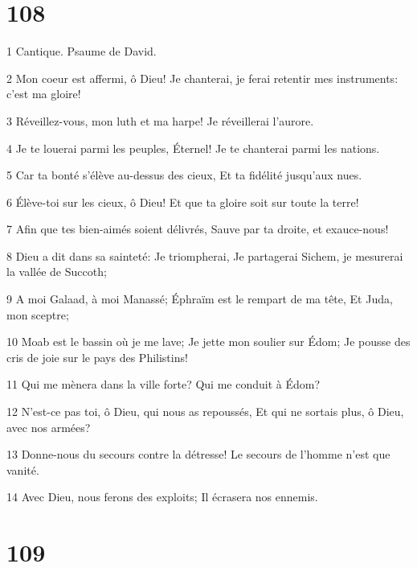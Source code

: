 \chapter{108}

\par 1 Cantique. Psaume de David.
\par 2 Mon coeur est affermi, ô Dieu! Je chanterai, je ferai retentir mes instruments: c'est ma gloire!
\par 3 Réveillez-vous, mon luth et ma harpe! Je réveillerai l'aurore.
\par 4 Je te louerai parmi les peuples, Éternel! Je te chanterai parmi les nations.
\par 5 Car ta bonté s'élève au-dessus des cieux, Et ta fidélité jusqu'aux nues.
\par 6 Élève-toi sur les cieux, ô Dieu! Et que ta gloire soit sur toute la terre!
\par 7 Afin que tes bien-aimés soient délivrés, Sauve par ta droite, et exauce-nous!
\par 8 Dieu a dit dans sa sainteté: Je triompherai, Je partagerai Sichem, je mesurerai la vallée de Succoth;
\par 9 A moi Galaad, à moi Manassé; Éphraïm est le rempart de ma tête, Et Juda, mon sceptre;
\par 10 Moab est le bassin où je me lave; Je jette mon soulier sur Édom; Je pousse des cris de joie sur le pays des Philistins!
\par 11 Qui me mènera dans la ville forte? Qui me conduit à Édom?
\par 12 N'est-ce pas toi, ô Dieu, qui nous as repoussés, Et qui ne sortais plus, ô Dieu, avec nos armées?
\par 13 Donne-nous du secours contre la détresse! Le secours de l'homme n'est que vanité.
\par 14 Avec Dieu, nous ferons des exploits; Il écrasera nos ennemis.

\chapter{109}

